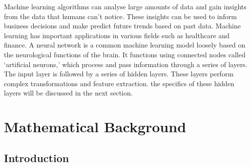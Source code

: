\documentclass[twocolumn,pra,floatfix]{revtex4-2}
\begin{document}
        Machine learning algorithms can analyse large amounts of data and gain insights from the data that humans can’t notice. These insights can be used to inform business decisions and make predict future trends based on past data. Machine learning has important applications in various fields such as healthcare and finance. A neural network is a common machine learning model loosely based on the neurological functions of the brain. It functions using connected nodes called ‘artificial neurons,’ which process and pass information through a series of layers. The input layer is followed by a series of hidden layers. These layers perform complex transformations and feature extraction. the specifics of these hidden layers will be discussed in the next section.

    \section{Mathematical Background \label{math section}}
    
        \subsection{Introduction}
\end{document}
